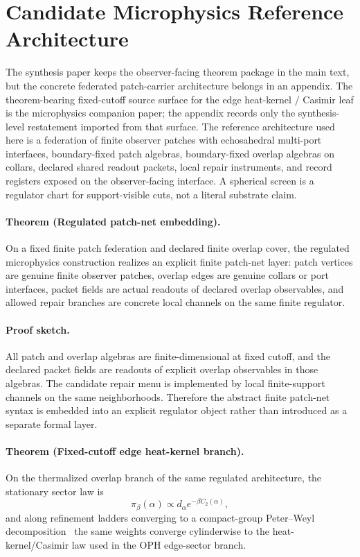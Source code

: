 \section{Candidate Microphysics Reference Architecture}

The synthesis paper keeps the observer-facing theorem package in the main text, but the concrete
federated patch-carrier architecture belongs in an appendix. The theorem-bearing fixed-cutoff
source surface for the edge heat-kernel / Casimir leaf is the microphysics companion paper; the
appendix records only the synthesis-level restatement imported from that surface. The reference
architecture used here is a federation of finite observer patches with echosahedral multi-port
interfaces, boundary-fixed patch algebras, boundary-fixed overlap algebras on collars, declared
shared readout packets, local repair instruments, and record registers exposed on the
observer-facing interface. A spherical screen is a regulator chart for support-visible cuts, not
a literal substrate claim.

\paragraph{Theorem (Regulated patch-net embedding).}
On a fixed finite patch federation and declared finite overlap cover, the regulated microphysics
construction realizes an explicit finite patch-net layer: patch vertices are genuine finite
observer patches, overlap edges are genuine collars or port interfaces, packet fields are actual
readouts of declared overlap observables, and allowed repair branches are concrete local channels
on the same finite regulator.

\paragraph{Proof sketch.}
All patch and overlap algebras are finite-dimensional at fixed cutoff, and the declared packet
fields are readouts of explicit overlap observables in those algebras. The candidate repair menu
is implemented by local finite-support channels on the same neighborhoods. Therefore the abstract
finite patch-net syntax is embedded into an explicit regulator object rather than introduced as a
separate formal layer.

\paragraph{Theorem (Fixed-cutoff edge heat-kernel branch).}
On the thermalized overlap branch of the same regulated architecture, the stationary sector law is
\[
\pi_\beta(\alpha)\propto d_\alpha e^{-\beta C_2(\alpha)},
\]
and along refinement ladders converging to a compact-group Peter--Weyl decomposition~\cite{peterWeyl27} the same
weights converge cylinderwise to the heat-kernel/Casimir law used in the OPH edge-sector branch.


